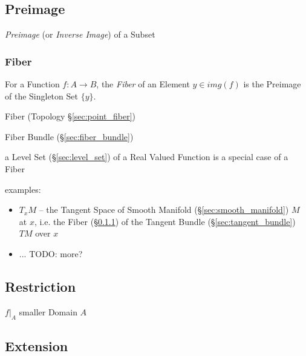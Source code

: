\subsection{Preimage}\label{sec:preimage}

\emph{Preimage} (or \emph{Inverse Image}) of a Subset



\subsubsection{Fiber}\label{sec:fiber}

For a Function $f : A \rightarrow B$, the \emph{Fiber} of an Element
$y \in img(f)$ is the Preimage of the Singleton Set $\{y\}$.

Fiber (Topology \S\ref{sec:point_fiber})

Fiber Bundle (\S\ref{sec:fiber_bundle})

a Level Set (\S\ref{sec:level_set}) of a Real Valued Function is a special case
of a Fiber

examples:
\begin{itemize}
  \item $T_x M$ -- the Tangent Space of Smooth Manifold
    (\S\ref{sec:smooth_manifold}) $M$ at $x$, i.e. the Fiber (\S\ref{sec:fiber})
    of the Tangent Bundle (\S\ref{sec:tangent_bundle}) $T M$ over $x$
  \item ... TODO: more?
\end{itemize}


\subsection{Restriction}\label{sec:function_restriction}

$f|_A$ smaller Domain $A$



\subsection{Extension}\label{sec:function_extension}

